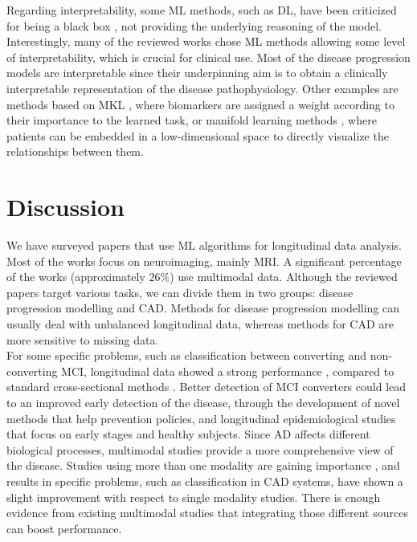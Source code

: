 Regarding interpretability, some ML methods, such as DL, have been criticized for being a black box \cite{Ching2018}, not providing the underlying reasoning of the model. Interestingly, many of the reviewed works chose ML methods allowing some level of interpretability, which is crucial for clinical use. Most of the disease progression models are interpretable since their underpinning aim is to obtain a clinically interpretable representation of the disease pathophysiology. Other examples are methods based on MKL \cite{Chen2015,Gonen2011,Zhang2012a}, where biomarkers are assigned a weight according to their importance to the learned task, or manifold learning methods \cite{Guerrero2015,guerrero,Wolz2010}, where patients can be embedded in a low-dimensional space to directly visualize the relationships between them.

\section{Discussion}
\label{sec:conclusion}

We have surveyed papers that use ML algorithms for longitudinal data analysis. Most of the works focus on neuroimaging, mainly MRI. A significant percentage of the works (approximately $26\%$) use multimodal data. Although the reviewed papers target various tasks, we can divide them in two groups: disease progression modelling and CAD. Methods for disease progression modelling can usually deal with unbalanced longitudinal data, whereas methods for CAD are more sensitive to missing data. \\

For some specific problems, such as classification between converting and non-converting MCI, longitudinal data showed a strong performance \cite{Liu2013,Sun2017}, compared to standard cross-sectional methods \cite{cuingnet}. Better detection of MCI converters could lead to an improved early detection of the disease, through the development of novel methods that help prevention policies, and longitudinal epidemiological studies that focus on early stages and healthy subjects. Since AD affects different biological processes, multimodal studies provide a more comprehensive view of the disease. Studies using more than one modality are gaining importance \cite{Chen2015,Chi2017,Hinrichs2011,Minhas2016,Zhang2012a}, and results in specific problems, such as classification in CAD systems, have shown a slight improvement with respect to single modality studies. There is enough evidence from existing multimodal studies \cite{Iturria-Medina2016,Jedynak2012,Oxtoby2018} that integrating those different sources can boost performance. \\

